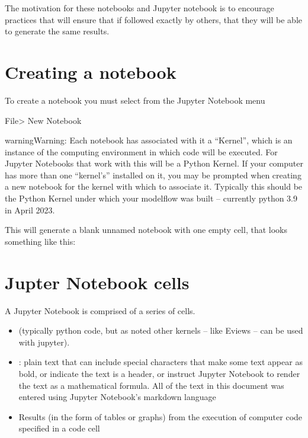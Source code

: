 \documentclass[letterpaper,10pt,english]{jupyterBook}
\begin{document}
\sphinxAtStartPar
The motivation for these notebooks and Jupyter notebook is to encourage practices that will ensure that if followed exactly by others, that they will be able to generate the same results.


\section{Creating a notebook}
\label{\detokenize{content/04_PythonEssentials/Intro_Jupyter_notebook:creating-a-notebook}}
\sphinxAtStartPar
To create a notebook you must select from the Jupyter Notebook menu

\sphinxAtStartPar
File\sphinxhyphen{}> New Notebook

\sphinxAtStartPar
{}

\begin{sphinxadmonition}{warning}{Warning:}
\sphinxAtStartPar
Each notebook has associated with it a “Kernel”, which is an instance of the computing environment in which code will be executed. For Jupyter Notebooks that work with  this will be a Python Kernel. If your computer has more than one “kernel’s” installed on it, you may be prompted when creating a new notebook for the kernel with which to associate it.  Typically this should be the Python Kernel under which your modelflow was built – currently python 3.9 in April 2023.
\end{sphinxadmonition}

\sphinxAtStartPar
This will generate a blank unnamed notebook with one empty cell, that looks something like this:

\sphinxAtStartPar
{}


\section{Jupter Notebook cells}
\label{\detokenize{content/04_PythonEssentials/Intro_Jupyter_notebook:jupter-notebook-cells}}
\sphinxAtStartPar
A Jupyter Notebook is comprised of a series of cells.

\sphinxAtStartPar
{}
\begin{itemize}
\item {} 
\sphinxAtStartPar
{} (typically python code, but as noted other kernels – like Eviews – can be used with jupyter).

\item {} 
\sphinxAtStartPar
{}: plain text that can include special characters that make some text appear as bold, or indicate the text is a header, or instruct Jupyter Notebook to render the text as a mathematical formula.  All of the text in this document was entered using Jupyter Notebook’s markdown language

\item {} 
\sphinxAtStartPar
Results (in the form of tables or graphs) from the execution of computer code specified in a code cell

\end{itemize}
\end{document}
